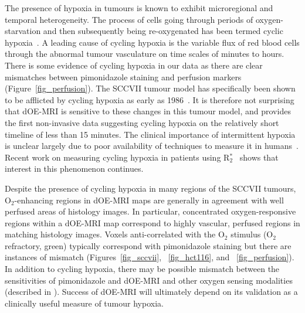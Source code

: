 The presence of hypoxia in tumours is known to exhibit microregional and temporal heterogeneity.
The process of cells going through periods of oxygen-starvation and then subsequently being re-oxygenated has been termed cyclic hypoxia~\cite{Dewhirst:2009de,Bayer:2011js, Bayer:2012kb}.
A leading cause of cycling hypoxia is the variable flux of red blood cells through the abnormal tumour vasculature on time scales of minutes to hours.
There is some evidence of cycling hypoxia in our data as there are clear mismatches between pimonidazole staining and perfusion markers (Figure~\ref{fig_perfusion}).
The SCCVII tumour model has specifically been shown to be afflicted by cycling hypoxia as early as  1986~\cite{Chaplin:1986iz}.
It is therefore not surprising that \acs{dOE-MRI} is sensitive to these changes in this tumour model, and provides the first non-invasive data suggesting cycling hypoxia on the relatively short timeline of less than 15 minutes.
The clinical importance of intermittent hypoxia is unclear largely due to poor availability of techniques to measure it in humans~\cite{Michiels:2016hv}. 
Recent work on measuring cycling hypoxia in patients using R$_2^*$~\cite{Panek:2017ge} shows that interest in this phenomenon continues.

Despite the presence of cycling hypoxia in many regions of the SCCVII tumours, O$_2$-enhancing regions in \acs{dOE-MRI} maps are generally in agreement with well perfused areas of histology images.
In particular, concentrated oxygen-responsive regions within a \acs{dOE-MRI} map correspond to highly vascular, perfused regions in matching histology images.
Voxels anti-correlated with the O$_2$ stimulus (O$_2$ refractory, green) typically correspond with pimonidazole staining but there are instances of mismatch (Figures~\ref{fig_sccvii}, ~\ref{fig_hct116}, and ~\ref{fig_perfusion}).
In addition to cycling hypoxia, there may be possible mismatch between the sensitivities of pimonidazole and dOE-MRI and other oxygen sensing modalities (described in \cite{Horsman:2012kw}).
Success of \acs{dOE-MRI} will ultimately depend on its validation as a clinically useful measure of tumour hypoxia.

